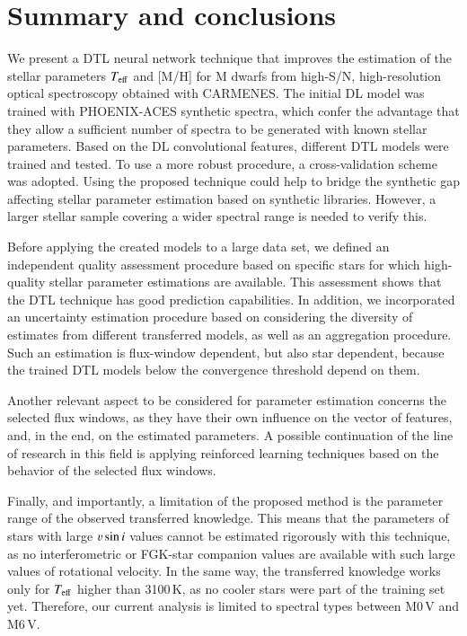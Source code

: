 \documentclass{aa}
\begin{document}

\section{Summary and conclusions}
\label{Summary}

We present a DTL neural network technique that improves the estimation of the stellar parameters $T_{\rm eff}$ and [M/H] for M dwarfs from high-S/N, high-resolution optical spectroscopy obtained with CARMENES. The initial DL model was trained with PHOENIX-ACES synthetic spectra, which confer the advantage that they allow a sufficient number of spectra to be generated with known stellar parameters. Based on the DL convolutional features, different DTL models were trained and tested. To use a more robust procedure, a cross-validation scheme was adopted. Using the proposed technique could help to bridge the synthetic gap affecting stellar parameter estimation based on synthetic libraries. However, a larger stellar sample covering a wider spectral range is needed to verify this.

Before applying the created models to a large data set, we defined an independent quality assessment procedure based on specific stars for which high-quality stellar parameter estimations are available.
This assessment shows that the DTL technique has good prediction capabilities. 
In addition, we incorporated an uncertainty estimation procedure based on considering the diversity of {estimates} from different transferred models, as well as an aggregation procedure. Such an estimation is flux-window dependent, but also star dependent, because the trained DTL models below the convergence threshold depend on them.

Another relevant aspect to be considered for parameter estimation concerns the selected flux windows, as they have their own influence {on} the vector of features, and, in the end, on the estimated parameters. A possible continuation of the line of research in this field is applying reinforced learning techniques based on the behavior of the selected flux windows.

Finally, and importantly, a limitation of the proposed method is the parameter range of the observed transferred knowledge. This means that the {parameters of} stars with large $\varv\sin{i}$ values {cannot} be estimated rigorously with this technique, as no interferometric or FGK-star companion values are available with such large values of rotational velocity. In the same way, the transferred knowledge works only for $T_{\rm eff}$ higher than 3100\,K, as no cooler stars were part of the training set yet. Therefore, our current analysis is limited to spectral types between M0\,V and M6\,V.
\end{document}
